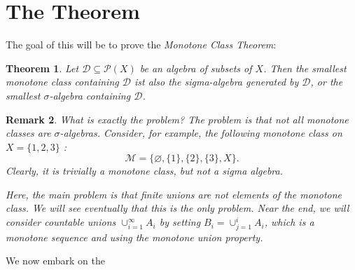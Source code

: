 \documentclass[prb,12pt]{revtex4-2}
\newtheorem{Theorem}{Theorem}
\newtheorem{Remark}[Theorem]{Remark}
\theoremstyle{definition}
\theoremstyle{definition}
\begin{document}
\section{The Theorem}
The goal of this will be to prove the \emph{Monotone Class Theorem}:
\begin{Theorem}
	Let $\mathcal{D}\subseteq \mathcal{P}(X)$ be an algebra of subsets of $X$. Then the smallest monotone class containing $\mathcal{D}$ ist also the sigma-algebra generated by $\mathcal{D}$, or the smallest $\sigma$-algebra containing $\mathcal{D}$. 
\end{Theorem}
\begin{Remark}
	What is exactly the problem? The problem is that not all monotone classes are $\sigma$-algebras. Consider, for example, the following monotone class on $X=\{1,2,3\} $ :
	\[
		\mathcal{M}=\{\varnothing,\{1\} ,\{2\} ,\{3\} ,X \} 
	.\] 
	Clearly, it is trivially a monotone class, but not a sigma algebra.

	Here, the main problem is that finite unions are not elements of the monotone class. We will see eventually that this is the \emph{only} problem. Near the end, we will consider countable unions $\cup_{i=1}^\infty A_i$ by setting $B_i=\cup_{j=1}^i A_i$, which is a monotone sequence and using the monotone union property.
\end{Remark}
We now embark on the
\end{document}

